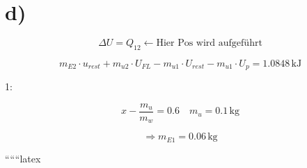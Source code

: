 

\section*{d)}

\[
\Delta U = Q_{12} \leftarrow \text{Hier Pos wird aufgeführt}
\]

\[
m_{E2} \cdot u_{rest} + m_{u2} \cdot U_{FL} - m_{u1} \cdot U_{rest} - m_{u1} \cdot U_p = 1.0848 \, \text{kJ}
\]

1:

\[
x - \frac{m_u}{m_w} = 0.6 \quad m_u = 0.1 \, \text{kg}
\]

\[
\Rightarrow m_{E1} = 0.06 \, \text{kg}
\]

``````latex